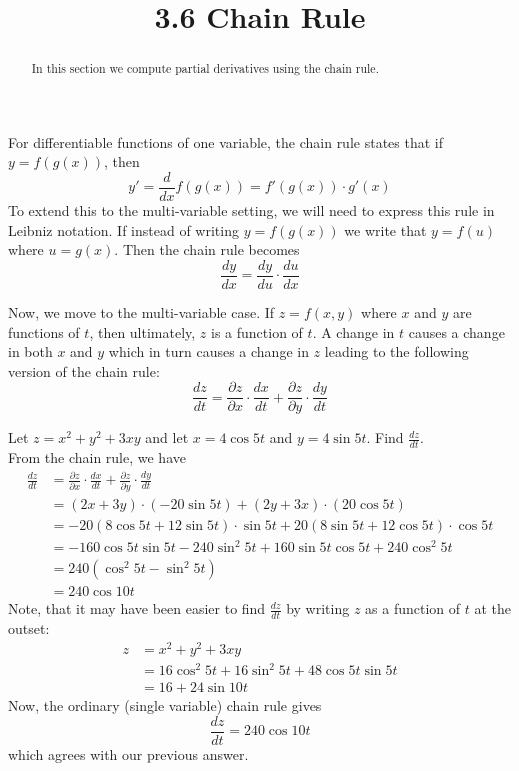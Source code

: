 \documentclass[handout]{ximera}
\title{3.6 Chain Rule}
\begin{document}
\begin{abstract}
In this section we compute partial derivatives using the chain rule.
\end{abstract}

\maketitle

For differentiable functions of one variable, the chain rule states that if $y = f(g(x))$, then 
\[
y' = \frac{d}{dx} f(g(x)) = f'(g(x)) \cdot g'(x)
\]
To extend this to the multi-variable setting, we will need to express this rule in Leibniz notation.
If instead of writing $y = f(g(x))$ we write that $y = f(u)$ where $ u = g(x)$.
Then the chain rule becomes
\[
\frac{dy}{dx} = \frac{dy}{du} \cdot \frac{du}{dx}
\]

Now, we move to the multi-variable case. If $z = f(x,y)$ where $x$ and $y$ are functions of $t$, then ultimately, $z$ is a function of $t$.
A change in $t$ causes a change in both $x$ and $y$ which in turn causes a change in $z$ leading to the following version of the chain rule:
\[
\frac{dz}{dt} = \frac{\partial z}{\partial x} \cdot \frac{dx}{dt} + \frac{\partial z}{\partial y} \cdot \frac{dy}{dt}
\]

\begin{example}[Example 1]
Let $z = x^2 + y^2 + 3xy$ and let $x = 4\cos 5t$ and $y = 4\sin 5t$. Find $\frac{dz}{dt}$.\\
From the chain rule, we have
\begin{align*}
\frac{dz}{dt} &= \frac{\partial z}{\partial x} \cdot \frac{dx}{dt} + \frac{\partial z}{\partial y} \cdot \frac{dy}{dt}\\
              &= \left(2x + 3y\right) \cdot \left(-20 \sin 5t\right) + \left(2y + 3x\right) \cdot \left(20 \cos 5t\right)\\
              &= -20(8 \cos 5t + 12 \sin 5t) \cdot \sin 5t  + 20 (8 \sin 5t + 12 \cos 5t) \cdot \cos 5t \\
              &= -160 \cos 5t \sin 5t -240 \sin^2 5t + 160 \sin 5t \cos 5t + 240 \cos^2 5t\\
              &= 240 (\cos^2 5t - \sin^2 5t)\\
              &= 240 \cos 10t
\end{align*}
Note, that it may have been easier to find $\frac{dz}{dt}$ by writing $z$ as a function of $t$ at the outset:
\begin{align*}
z &= x^2 + y^2 + 3xy \\
   &= 16 \cos^2 5t + 16 \sin^2 5t + 48 \cos 5t \sin 5t\\
   & = 16 + 24 \sin 10t
\end{align*}
Now, the ordinary (single variable) chain rule gives
\[
\frac{dz}{dt} = 240 \cos 10t
\]
which agrees with our previous answer.
\end{example}
\end{document}
